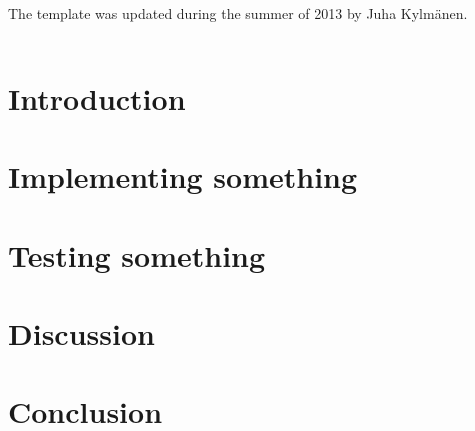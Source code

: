 \documentclass[a4paper, 12pt,titlepage]{dithesis}
\begin{document}
The template was updated during the summer of 2013 by Juha Kylmänen.


\setlongtables
\begin{longtable}[l]{p{3cm}p{}}



\end{longtable}
\setcounter{table}{0}

\chapter{Introduction}
\sivunumerot

\chapter{Implementing something}

\chapter{Testing something}

\chapter{Discussion}

\chapter{Conclusion}

\printbibliography[title=REFERENCES, heading=bibnumbered]
\end{document}
